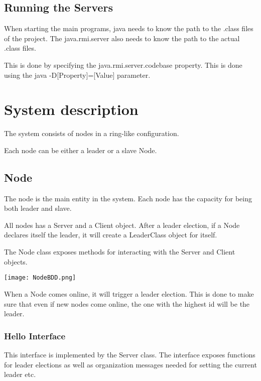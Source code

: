 \begin{center}
\end{center}

\subsection{Running the Servers}
When starting the main programs, java needs to know the path to the .class files of the project. The java.rmi.server also needs to know the path to the actual .class files.

This is done by specifying the java.rmi.server.codebase property. This is done using the java -D[Property]=[Value] parameter.

\section{System description}
The system consists of nodes in a ring-like configuration.

Each node can be either a leader or a slave Node. 
\subsection{Node}
The node is the main entity in the system. Each node has the capacity for being both leader and slave. 

All nodes has a Server and a Client object. After a leader election, if a Node declares itself the leader, it will create a LeaderClass object for itself. 

The Node class exposes methods for interacting with the Server and Client objects.

\begin{center}
	\texttt{[image: NodeBDD.png]}
\end{center}

When a Node comes online, it will trigger a leader election. This is done to make sure that even if new nodes come online, the one with the highest id will be the leader.

\subsubsection{Hello Interface}
This interface is implemented by the Server class. The interface exposes functions for leader elections as well as organization messages needed for setting the current leader etc.

